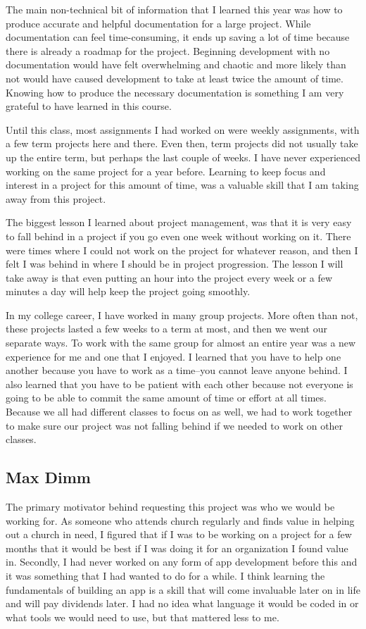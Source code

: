 \documentclass[letterpaper,10pt,draftclsnofoot,onecolumn,titlepage]{IEEEtran}
\begin{document}
		The main non-technical bit of information that I learned this year was how to produce accurate and helpful documentation for a large project.
		While documentation can feel time-consuming, it ends up saving a lot of time because there is already a roadmap for the project.
		Beginning development with no documentation would have felt overwhelming and chaotic and more likely than not would have caused development to take at least twice the amount of time.
		Knowing how to produce the necessary documentation is something I am very grateful to have learned in this course.

		Until this class, most assignments I had worked on were weekly assignments, with a few term projects here and there.
		Even then, term projects did not usually take up the entire term, but perhaps the last couple of weeks.
		I have never experienced working on the same project for a year before.
		Learning to keep focus and interest in a project for this amount of time, was a valuable skill that I am taking away from this project.


		The biggest lesson I learned about project management, was that it is very easy to fall behind in a project if you go even one week without working on it.
		There were times where I could not work on the project for whatever reason, and then I felt I was behind in where I should be in project progression.
		The lesson I will take away is that even putting an hour into the project every week or a few minutes a day will help keep the project going smoothly.

		In my college career, I have worked in many group projects.
		More often than not, these projects lasted a few weeks to a term at most, and then we went our separate ways.
		To work with the same group for almost an entire year was a new experience for me and one that I enjoyed.
		I learned that you have to help one another because you have to work as a time--you cannot leave anyone behind.
		I also learned that you have to be patient with each other because not everyone is going to be able to commit the same amount of time or effort at all times.
		Because we all had different classes to focus on as well, we had to work together to make sure our project was not falling behind if we needed to work on other classes.


	\subsection{Max Dimm}
	The primary motivator behind requesting this project was who we would be working for. 
As someone who attends church regularly and finds value in helping out a church in need, I figured that if I was to be working on a project for a few months that it would be best if I was doing it for an organization I found value in. 
Secondly, I had never worked on any form of app development before this and it was something that I had wanted to do for a while. 
I think learning the fundamentals of building an app is a skill that will come invaluable later on in life and will pay dividends later. 
I had no idea what language it would be coded in or what tools we would need to use, but that mattered less to me.
\end{document}
